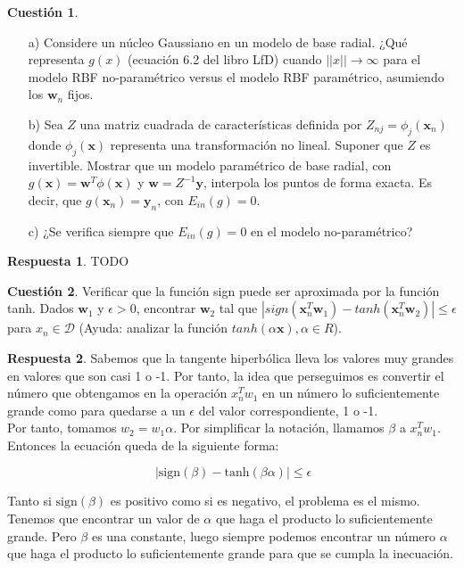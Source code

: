 \documentclass[10pt,a4paper]{article}
\theoremstyle{definition}
\newtheorem{cuestion}{Cuestión}
\newtheorem*{respuesta}{Respuesta}
\begin{document}
\begin{cuestion}
\begin{enumerate}
\item[a)] Considere un núcleo Gaussiano en un modelo de base radial. ¿Qué representa $g(x)$ (ecuación 6.2 del libro LfD) cuando $||x|| \rightarrow \infty$ para el modelo RBF no-paramétrico versus el modelo RBF paramétrico, asumiendo los $\mathbf{w}_n$ fijos.
\item[b)] Sea $Z$ una matriz cuadrada de características definida por $Z_{nj} = \phi_j(\mathbf{x}_n)$ donde $\phi_j(\mathbf{x})$ representa una transformación no lineal. Suponer que $Z$ es invertible. Mostrar que un modelo paramétrico de base radial, con $g(\mathbf{x}) = \mathbf{w}^T \phi(\mathbf{x})$ y $\mathbf{w} = Z^{-1}\mathbf{y}$, interpola los puntos de forma exacta. Es decir, que $g(\mathbf{x}_n) = \mathbf{y}_n$, con $E_{in}(g)=0$.
\item[c)] ¿Se verifica siempre que $E_{in}(g)=0$ en el modelo no-paramétrico?
\end{enumerate}

\end{cuestion}
\begin{respuesta}
TODO
\end{respuesta}

\begin{cuestion}
Verificar que la función sign puede ser aproximada por la función tanh. Dados $\mathbf{w}_1$ y $\epsilon > 0$, encontrar $\mathbf{w}_2$ tal que $|sign(\mathbf{x}_n^T \mathbf{w}_1) - tanh(\mathbf{x}_n^T \mathbf{w}_2)| \leq \epsilon$ para $x_n \in \mathcal{D}$ (Ayuda: analizar la función $tanh(\alpha \mathbf{x}), \alpha \in R$).\\
\end{cuestion}
\begin{respuesta}
Sabemos que la tangente hiperbólica lleva los valores muy grandes en valores que son casi 1 o -1. Por tanto, la idea que perseguimos es convertir el número que obtengamos en la operación $x_n^Tw_1$ en un número lo suficientemente grande como para quedarse a un $\epsilon$ del valor correspondiente, 1 o -1.\\

Por tanto, tomamos $w_2 =  w_1 \alpha$. Por simplificar la notación, llamamos $\beta$ a $x_n^Tw_1$. Entonces la ecuación queda de la siguiente forma:

\[
\ \left| \textrm{sign}(\beta)- \textrm{tanh}(\beta \alpha)\right| \leq \epsilon
\]

Tanto si $\textrm{sign}(\beta)$ es positivo como si es negativo, el problema es el mismo. Tenemos que encontrar un valor de $\alpha$ que haga el producto lo suficientemente grande. Pero $\beta$ es una constante, luego siempre podemos encontrar un número $\alpha$ que haga el producto lo suficientemente grande para que se cumpla la inecuación. 
\end{respuesta}
\end{document}
